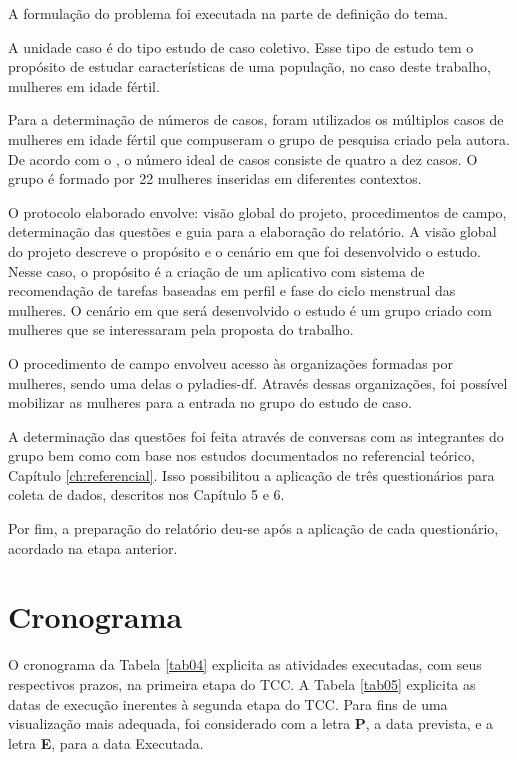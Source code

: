 A formulação do problema foi executada na parte de definição do tema.

A unidade caso é do tipo estudo de caso coletivo. Esse tipo de estudo tem o propósito de estudar características
de uma população, no caso deste trabalho, mulheres em idade fértil.

Para a determinação de números de casos, foram utilizados os múltiplos casos de mulheres em idade fértil que compuseram o grupo de pesquisa criado pela autora. De acordo com o , 
o número ideal de casos consiste de quatro a dez casos. O grupo é formado por 22 mulheres inseridas em diferentes contextos.

O protocolo elaborado envolve: visão global do projeto, procedimentos de campo, determinação das questões e guia para a elaboração do relatório.
A visão global do projeto descreve o propósito e o cenário em que foi desenvolvido o estudo. Nesse caso, o propósito é a criação de um aplicativo com sistema de recomendação de tarefas baseadas 
em perfil e fase do ciclo menstrual das mulheres. O cenário em que será desenvolvido o estudo é um grupo criado com mulheres que se interessaram pela proposta do trabalho.

O procedimento de campo envolveu acesso às organizações formadas por mulheres, sendo uma delas o pyladies-df. Através dessas organizações, foi possível mobilizar as mulheres 
para a entrada no grupo do estudo de caso.

A determinação das questões foi feita através de conversas com as 
integrantes do grupo bem como com base nos estudos documentados no 
referencial teórico, Capítulo \ref{ch:referencial}. Isso possibilitou a aplicação de 
três questionários para coleta de dados, descritos nos Capítulo 5 e 6.

Por fim, a preparação do relatório deu-se após a aplicação de cada questionário, acordado na etapa anterior.

\section{Cronograma}
\label{46}


O cronograma da Tabela \ref{tab04} explicita as atividades executadas, 
com seus respectivos prazos, na primeira etapa do TCC. A Tabela \ref{tab05} explicita as datas 
de execução inerentes à segunda etapa do TCC. Para fins de uma visualização mais adequada, 
foi considerado com a letra \textbf{P}, a data prevista, e a letra \textbf{E},
para a data Executada.

